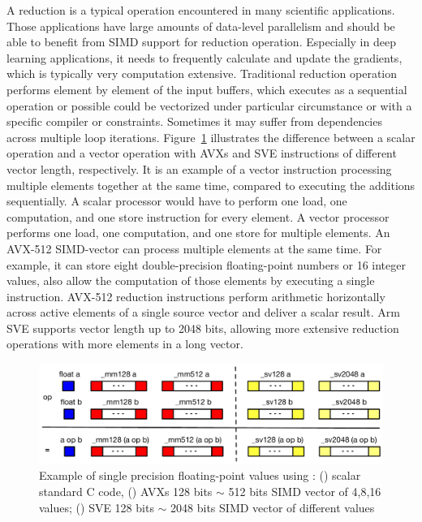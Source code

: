 \documentclass[5p,times,twocolumn]{elsarticle}
\begin{document}
A reduction is a typical operation encountered in many scientific applications.
Those applications have large amounts of data-level parallelism and should be able
to benefit from SIMD support for reduction operation. Especially in deep learning applications,
it needs to frequently calculate and update the gradients, which is typically very computation extensive.
Traditional reduction operation performs element by element of the input buffers,
which executes as a sequential operation or possible could be vectorized
under particular circumstance or with a specific compiler or constraints. Sometimes
it may suffer from dependencies across multiple loop iterations.
%
Figure~\ref{fig:sseavx} illustrates the difference between a scalar operation and
a vector operation with AVXs and SVE instructions of different vector length, respectively.
%
It is an example of a vector instruction processing multiple elements together at the same time,
compared to executing the additions sequentially. A scalar processor would have to perform one load,
one computation, and one store instruction for every element. A vector processor performs one load,
one computation, and one store for multiple elements.
An AVX-512 SIMD-vector can process multiple elements at
the same time. For example, it can store eight double-precision floating-point numbers or 16 integer values, also allow the computation of those elements by executing a single instruction.
AVX-512 reduction instructions perform arithmetic horizontally across active elements of a
single source vector and deliver a scalar result. Arm SVE supports vector length up to 2048 bits,
allowing more extensive reduction operations with more elements in a long vector.

\begin{figure}[h]
    \centering
    \includegraphics[width=\linewidth]{sse_avx.pdf}
    \caption{Example of single precision floating-point values using : (\colorbox{blue}{})
    scalar standard C code,
    (\colorbox{red}{}) AVXs 128 bits $\sim$ 512 bits SIMD vector of 4,8,16 values;
    (\colorbox{yellow}{}) SVE 128 bits $\sim$ 2048 bits SIMD vector of different values}
    \label{fig:sseavx}
\end{figure}
\end{document}
